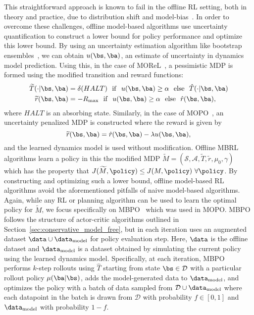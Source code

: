 This straightforward approach is known to fail in the offline RL setting, both in theory and practice, due to distribution shift and model-bias~\cite{RossB12, kidambi2020morel}. In order to overcome these challenges, offline model-based algorithms use uncertainty quantification to construct a lower bound for policy performance and optimize this lower bound. By using an uncertainty estimation algorithm like bootstrap ensembles~\cite{OsbandAC18, Azizzadenesheli18, BurdaESK19, POLO}, we can obtain $u(\bs, \ba)$, an estimate of uncertainty in dynamics model prediction. 
Using this, in the case of MOReL~\cite{kidambi2020morel}, a pessimistic MDP is formed using the modified transition and reward functions:
\begin{align*}
\widetilde{T}(\cdot|\bs, \ba) & = \delta(HALT) \ \ \mathrm{if} \ \ u(\bs, \ba) \geq \alpha \ \  \mathrm{else} \ \ \hat{T}(\cdot|\bs, \ba) \\
\widetilde{r} (\bs, \ba) & = - R_{\max} \ \  \mathrm{if} \ \ u(\bs, \ba) \geq \alpha \ \  \mathrm{else} \ \ \hat{r}(\bs, \ba),
\end{align*}
where $HALT$ is an absorbing state. 
Similarly, in the case of MOPO~\cite{yu2020mopo}, an uncertainty penalized MDP is constructed where the reward is given by
\[
\widetilde{r} (\bs, \ba) = \hat{r}(\bs, \ba) - \lambda u(\bs, \ba),
\]
and the learned dynamics model is used without modification. Offline MBRL algorithms learn a policy in this the modified MDP $\widetilde{M} = (\mathcal{S}, \mathcal{A}, \widetilde{T}, \widetilde{r}, \mu_0, \gamma)$ which has the property that $J(\widetilde{M}, \policy) \leq J(M, \policy) \ \forall \policy$. 
By constructing and optimizing such a lower bound, offline model-based RL algorithms avoid the aforementioned pitfalls of naive model-based algorithms.
Again, while any RL or planning algorithm can be used to learn the optimal policy for $\widetilde{M}$, we focus specifically on MBPO~\cite{janner2019trust, sutton1991dyna} which was used in MOPO. MBPO follows the structure of actor-critic algorithms outlined in Section~\ref{sec:conservative_model_free}, but in each iteration uses an augmented dataset $\data \cup \data_{\text{model}}$ for policy evaluation step. Here, $\data$ is the offline dataset and $\data_{\text{model}}$ is a dataset obtained by simulating the current policy using the learned dynamics model. Specifically, at each iteration, MBPO performs $k$-step rollouts using $\widehat{T}$ starting from state $\bs \in \mathcal{D}$ with a particular rollout policy $\mu(\ba|\bs)$, adds the model-generated data to $\data_{\text{model}}$, and optimizes the policy with a batch of data sampled from $\mathcal{D} \cup \data_{\text{model}}$ where each datapoint in the batch is drawn from $\mathcal{D}$ with probability $f \in [0, 1]$ and $\data_{\text{model}}$ with probability $1 - f$.

